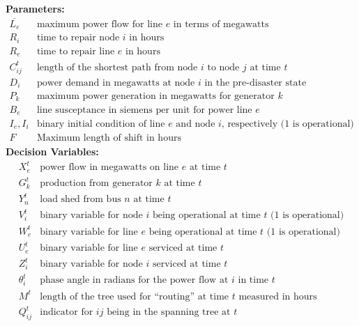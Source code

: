 \textbf{Parameters:}
\begin{displaymath}
\begin{array}{ll}
\overline{L_e} & \mbox{maximum power flow for line $e$ in terms of megawatts}\\
R_{i} & \mbox{time to repair node $i$ in hours} \\
R_{e} & \mbox{time to repair line $e$ in hours}\\
C_{ij}^t & \mbox{length of the shortest path from node $i$ to node $j$ at time $t$}\\
D_i & \mbox{power demand in megawatts at node $i$ in the pre-disaster state}\\
P_k & \mbox{maximum power generation in megawatts for generator $k$}\\
B_e&  \mbox{line susceptance in siemens per unit for power line $e$}\\
I_e, I_i & \mbox{binary initial condition of line $e$ and node $i$, respectively (1 is operational)}\\
F & \mbox{Maximum length of shift in hours}
\end{array}
\end{displaymath}
\textbf{Decision Variables:}
\begin{displaymath}
\begin{array}{ll}
X_{e}^{t} & \mbox{power flow in megawatts on line  $e$ at time $t$}\\
G_{k}^t & \mbox{production from generator $k$ at time $t$}\\
Y_{n}^t & \mbox{load shed from bus $n$ at time $t$}\\ 
V_i^t & \mbox{binary variable for node $i$ being operational at time $t$ (1 is operational)}\\
W_{e}^t & \mbox{binary variable for line $e$ being operational at time $t$ (1 is operational)}\\
U_{e}^t & \mbox{binary variable for line $e$ serviced at time $t$}\\
Z_i^t & \mbox{binary variable for node $i$ serviced at time $t$}\\
\theta_i^t & \mbox{phase angle in radians for the power flow at $i$ in time $t$}\\
M^t & \mbox{length of the tree used for ``routing'' at time $t$ measured in hours} \\
Q_{ij}^t & \mbox{indicator for $ij$ being in the spanning tree at $t$}
\end{array}
\end{displaymath}

